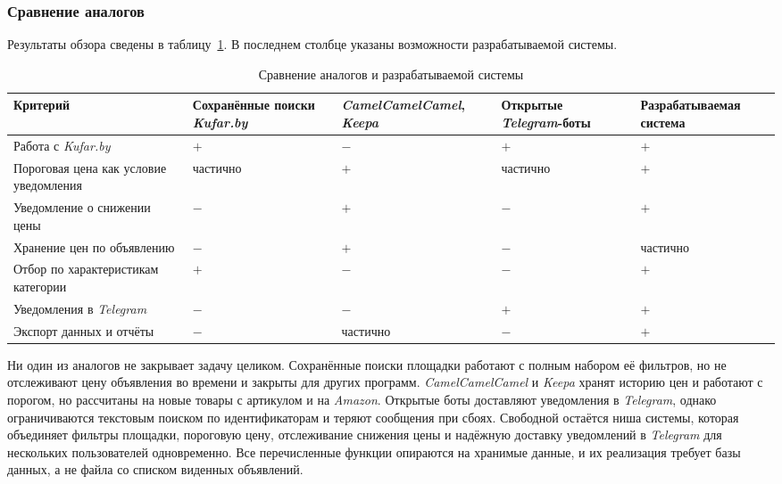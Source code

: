 \subsubsection{Сравнение аналогов}

Результаты обзора сведены в таблицу~\ref{table:analysis:analogues}. В последнем столбце указаны возможности разрабатываемой системы.

\begin{table}[ht]
\caption{Сравнение аналогов и разрабатываемой системы}
\label{table:analysis:analogues}
\centering
	\begin{tabular}{|>{\raggedright}m{}
	                |>{\centering}m{}
	                |>{\centering}m{}
	                |>{\centering}m{}
	                |>{\centering\arraybackslash}m{}|}
	\hline
	\centering Критерий & Сохранён\-ные поиски \textit{Kufar.by} & \textit{CamelCamel\-Camel}, \textit{Keepa} & Открытые \textit{Telegram}-боты & Разрабаты\-ваемая система \\
	\hline Работа с \textit{Kufar.by} & $+$ & $-$ & $+$ & $+$ \\
	\hline Пороговая цена как условие уведомления & частично & $+$ & частично & $+$ \\
	\hline Уведомление о снижении цены & $-$ & $+$ & $-$ & $+$ \\
	\hline Хранение цен по объявлению & $-$ & $+$ & $-$ & частично \\
	\hline Отбор по характеристикам категории & $+$ & $-$ & $-$ & $+$ \\
	\hline Уведомления в \textit{Telegram} & $-$ & $-$ & $+$ & $+$ \\
	\hline Экспорт данных и отчёты & $-$ & частично & $-$ & $+$ \\
	\hline
	\end{tabular}
\end{table}

Ни один из аналогов не закрывает задачу целиком. Сохранённые поиски площадки работают с полным набором её фильтров, но не отслеживают цену объявления во времени и закрыты для других программ. \textit{CamelCamelCamel} и \textit{Keepa} хранят историю цен и работают с порогом, но рассчитаны на новые товары с артикулом и на \textit{Amazon}. Открытые боты доставляют уведомления в \textit{Telegram}, однако ограничиваются текстовым поиском по идентификаторам и теряют сообщения при сбоях. Свободной остаётся ниша системы, которая объединяет фильтры площадки, пороговую цену, отслеживание снижения цены и надёжную доставку уведомлений в \textit{Telegram} для нескольких пользователей одновременно. Все перечисленные функции опираются на хранимые данные, и их реализация требует базы данных, а не файла со списком виденных объявлений.

